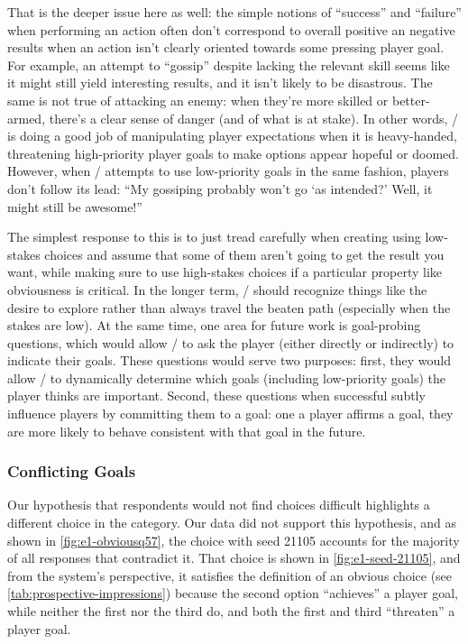 That is the deeper issue here as well: the simple notions of ``success'' and ``failure'' when performing an action often don't correspond to overall positive an negative results when an action isn't clearly oriented towards some pressing player goal.
%
For example, an attempt to ``gossip'' despite lacking the relevant skill seems like it might still yield interesting results, and it isn't likely to be disastrous.
%
The same is not true of attacking an enemy: when they're more skilled or better-armed, there's a clear sense of danger (and of what is at stake).
%
In other words, \dunyazad/ is doing a good job of manipulating player expectations when it is heavy-handed, threatening high-priority player goals to make options appear hopeful or doomed.
%
However, when \dunyazad/ attempts to use low-priority goals in the same fashion, players don't follow its lead: ``My gossiping probably won't go `as intended?' Well, it might still be awesome!''


The simplest response to this is to just tread carefully when creating using low-stakes choices and assume that some of them aren't going to get the result you want, while making sure to use high-stakes choices if a particular property like obviousness is critical.
%
In the longer term, \dunyazad/ should recognize things like the desire to explore rather than always travel the beaten path (especially when the stakes are low).
%
At the same time, one area for future work is goal-probing questions, which would allow \dunyazad/ to ask the player (either directly or indirectly) to indicate their goals.
%
These questions would serve two purposes: first, they would allow \dunyazad/ to dynamically determine which goals (including low-priority goals) the player thinks are important.
%
Second, these questions when successful subtly influence players by committing them to a goal: one a player affirms a goal, they are more likely to behave consistent with that goal in the future.


\subsubsection{Conflicting Goals}


Our hypothesis that respondents would not find \obv{} choices difficult highlights a different choice in the \obv{} category.
%
Our data did not support this hypothesis, and as shown in \cref{fig:e1-obviousq57}, the choice with seed 21105 accounts for the majority of all responses that contradict it.
%
That choice is shown in \cref{fig:e1-seed-21105}, and from the system's perspective, it satisfies the definition of an obvious choice (see \cref{tab:prospective-impressions}) because the second option ``achieves'' a player goal, while neither the first nor the third do, and both the first and third ``threaten'' a player goal.


